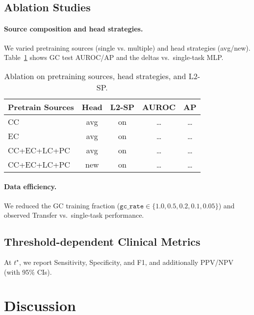 \documentclass[journal,article,submit,pdftex,moreauthors]{Definitions/mdpi}
\begin{document}
\subsection{Ablation Studies}
\paragraph{Source composition and head strategies.}
We varied pretraining sources (single vs. multiple) and head strategies (avg/new).
Table~\ref{tab:ablation} shows GC test AUROC/AP and the deltas vs.\ single-task MLP.

\begin{table}[H]
\caption{Ablation on pretraining sources, head strategies, and L2-SP.}
\label{tab:ablation}
\centering
\begin{tabular}{lcccc}
\toprule
Pretrain Sources & Head & L2-SP & AUROC & AP \\
\midrule
CC & avg & on & \dots & \dots \\
EC & avg & on & \dots & \dots \\
CC+EC+LC+PC & avg & on & \dots & \dots \\
CC+EC+LC+PC & new & on & \dots & \dots \\
\bottomrule
\end{tabular}
\end{table}

\paragraph{Data efficiency.}
We reduced the GC training fraction ($\texttt{gc\_rate}\in\{1.0,0.5,0.2,0.1,0.05\}$) and observed Transfer vs.\ single-task performance. %

\subsection{Threshold-dependent Clinical Metrics}
At $t^\star$, we report Sensitivity, Specificity, and F1, and additionally PPV/NPV (with 95\% CIs).


\section{Discussion}
\end{document}
